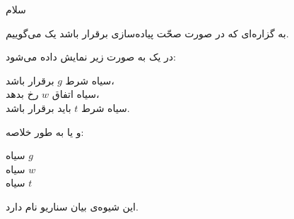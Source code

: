  

سلام

 به گزاره‌ای که در صورت صحّت پیاده‌سازی برقرار باشد یک
 می‌گوییم.   

در  یک  به صورت زیر نمایش
داده می‌شود:

{
‌سیاه{} شرط $g$ برقرار باشد، \\
‌سیاه{} اتفاق $w$ رخ بدهد، \\
‌سیاه{} شرط $t$ باید برقرار باشد.
}

و یا به طور خلاصه:

{
‌سیاه{} $g$ \\
‌سیاه{} $w$ \\
‌سیاه{} $t$
}

این شیوه‌ی بیان سناریو  نام دارد.


